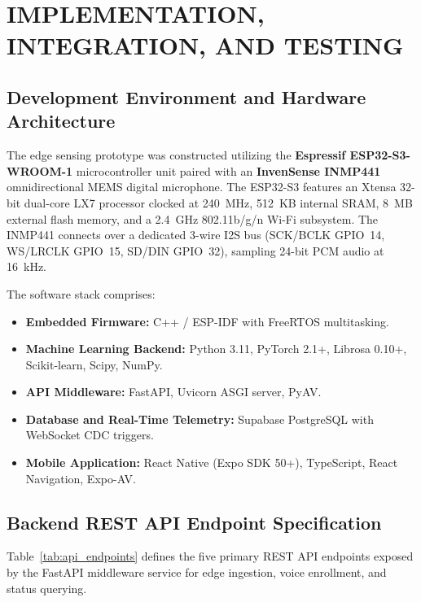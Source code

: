 \documentclass[12pt, a4paper]{report}
\begin{document}
\chapter{IMPLEMENTATION, INTEGRATION, AND TESTING}

\section{Development Environment and Hardware Architecture}
The edge sensing prototype was constructed utilizing the \textbf{Espressif ESP32-S3-WROOM-1} microcontroller unit paired with an \textbf{InvenSense INMP441} omnidirectional MEMS digital microphone. The ESP32-S3 features an Xtensa 32-bit dual-core LX7 processor clocked at 240~MHz, 512~KB internal SRAM, 8~MB external flash memory, and a 2.4~GHz 802.11b/g/n Wi-Fi subsystem. The INMP441 connects over a dedicated 3-wire I2S bus (SCK/BCLK GPIO~14, WS/LRCLK GPIO~15, SD/DIN GPIO~32), sampling 24-bit PCM audio at 16~kHz.

The software stack comprises:
\begin{itemize}
    \item \textbf{Embedded Firmware:} C++ / ESP-IDF with FreeRTOS multitasking.
    \item \textbf{Machine Learning Backend:} Python 3.11, PyTorch 2.1+, Librosa 0.10+, Scikit-learn, Scipy, NumPy.
    \item \textbf{API Middleware:} FastAPI, Uvicorn ASGI server, PyAV.
    \item \textbf{Database and Real-Time Telemetry:} Supabase PostgreSQL with WebSocket CDC triggers.
    \item \textbf{Mobile Application:} React Native (Expo SDK 50+), TypeScript, React Navigation, Expo-AV.
\end{itemize}

\section{Backend REST API Endpoint Specification}
Table~\ref{tab:api_endpoints} defines the five primary REST API endpoints exposed by the FastAPI middleware service for edge ingestion, voice enrollment, and status querying.
\end{document}
